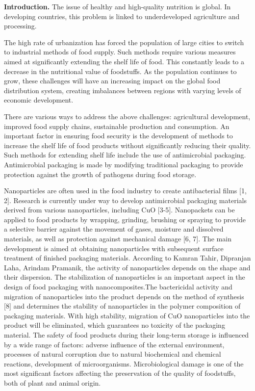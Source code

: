 \begin{multicols}{2}
{\bfseries Introduction.} The issue of healthy and high-quality nutrition
is global. In developing countries, this problem is linked to
underdeveloped agriculture and processing.

The high rate of urbanization has forced the population of large cities
to switch to industrial methods of food supply. Such methods require
various measures aimed at significantly extending the shelf life of
food. This constantly leads to a decrease in the nutritional value of
foodstuffs. As the population continues to grow, these challenges will
have an increasing impact on the global food distribution system,
creating imbalances between regions with varying levels of economic
development.

There are various ways to address the above challenges: agricultural
development, improved food supply chains, sustainable production and
consumption. An important factor in ensuring food security is the
development of methods to increase the shelf life of food products
without significantly reducing their quality. Such methods for extending
shelf life include the use of antimicrobial packaging. Antimicrobial
packaging is made by modifying traditional packaging to provide
protection against the growth of pathogens during food storage.

Nanoparticles are often used in the food industry to create
antibacterial films {[}1, 2{]}. Research is currently under way to
develop antimicrobial packaging materials derived from various
nanoparticles, including CuO {[}3-5{]}. Nanopackets can be applied to
food products by wrapping, grinding, brushing or spraying to provide a
selective barrier against the movement of gases, moisture and dissolved
materials, as well as protection against mechanical damage {[}6, 7{]}.
The main development is aimed at obtaining nanoparticles with subsequent
surface treatment of finished packaging materials. According to Kamran
Tahir, Dipranjan Laha, Arindam Pramanik, the activity of nanoparticles
depends on the shape and their dispersion. The stabilization of
nanoparticles is an important aspect in the design of food packaging
with nanocomposites.The bactericidal activity and migration of
nanoparticles into the product depends on the method of synthesis
{[}8{]} and determines the stability of nanoparticles in the polymer
composition of packaging materials. With high stability, migration of
CuO nanoparticles into the product will be eliminated, which guarantees
no toxicity of the packaging material. The safety of food products
during their long-term storage is influenced by a wide range of factors:
adverse influence of the external environment, processes of natural
corruption due to natural biochemical and chemical reactions,
development of microorganisms. Microbiological damage is one of the most
significant factors affecting the preservation of the quality of
foodstuffs, both of plant and animal origin.


\end{multicols}
